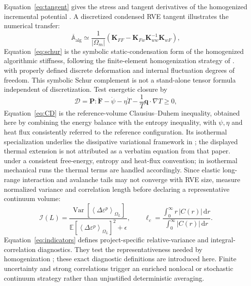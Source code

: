 \documentclass[11pt,a4paper]{article}
\newcommand{\dd}{\mathrm{d}}\newcommand{\avg}[1]{\left\langle #1\right\rangle}\newcommand{\Grad}{\operatorname{Grad}}
\begin{document}
Equation~\eqref{eq:tangent} gives the stress and tangent derivatives of the homogenized incremental potential \cite{miehe2002a,miehe2002b}.
A discretized condensed RVE tangent illustrates the numerical transfer:
\begin{equation}
 \overline{\mathbb A}_{\mathrm{alg}}\simeq
 \frac{1}{|\Omega_m|}\left(\mathbf K_{FF}
 -\mathbf K_{Fw}\mathbf K_{ww}^{-1}\mathbf K_{wF}\right),\label{eq:schur}
\end{equation}
Equation~\eqref{eq:schur} is the symbolic static-condensation form of the homogenized algorithmic stiffness, following the finite-element homogenization strategy of \cite{miehe1999,miehe2002b}.
with properly defined discrete deformation and internal fluctuation degrees of freedom. This symbolic Schur complement is not a stand-alone tensor formula independent of discretization. Test energetic closure by
\begin{equation}
 \mathcal D=\mathbf P:\dot{\mathbf F}-\dot\psi-\eta\dot T
 -\frac{1}{T}\mathbf q\cdot\nabla T\ge0,\label{eq:CD}
\end{equation}
Equation~\eqref{eq:CD} is the reference-volume Clausius--Duhem inequality, obtained here by combining the energy balance with the entropy inequality, with $\psi,\eta$ and heat flux consistently referred to the reference configuration. Its isothermal specialization underlies the dissipative variational framework in \cite{miehe2002a}; the displayed thermal extension is not attributed as a verbatim equation from that paper.
under a consistent free-energy, entropy and heat-flux convention; in isothermal mechanical runs the thermal terms are handled accordingly. Since elastic long-range interaction and avalanche tails may not converge with RVE size, measure normalized variance and correlation length before declaring a representative continuum volume:
\begin{equation}
 \mathcal I(L)=\frac{\operatorname{Var}[\avg{\Delta\varepsilon^p}_{\Omega_L}]}
 {\mathbb E[\avg{\Delta\varepsilon^p}_{\Omega_L}]^2+\epsilon},\qquad
 \ell_c=\frac{\int_0^\infty r\,|C(r)|\,\dd r}{\int_0^\infty |C(r)|\,\dd r}.\label{eq:indicators}
\end{equation}
Equation~\eqref{eq:indicators} defines project-specific relative-variance and integral-correlation diagnostics. They test the representativeness needed by homogenization \cite{miehe1999}; these exact diagnostic definitions are introduced here.
Finite uncertainty and strong correlations trigger an enriched nonlocal or stochastic continuum strategy rather than unjustified deterministic averaging.
\end{document}
